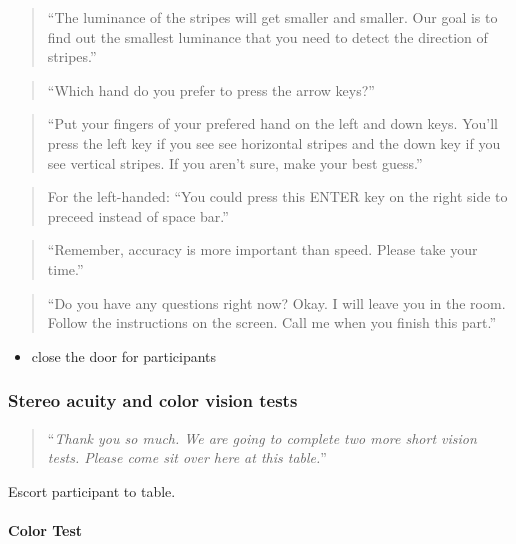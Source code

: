\documentclass[]{article}
\providecommand{\tightlist}{%
  \setlength{\itemsep}{0pt}\setlength{\parskip}{0pt}}
\let\oldparagraph\paragraph
\renewcommand{\paragraph}[1]{\oldparagraph{#1}\mbox{}}
\begin{document}
\begin{quote}
``The luminance of the stripes will get smaller and smaller. Our goal is
to find out the smallest luminance that you need to detect the direction
of stripes.''
\end{quote}

\begin{quote}
``Which hand do you prefer to press the arrow keys?''
\end{quote}

\begin{quote}
``Put your fingers of your prefered hand on the left and down keys.
You'll press the left key if you see see horizontal stripes and the down
key if you see vertical stripes. If you aren't sure, make your best
guess.''
\end{quote}

\begin{quote}
For the left-handed: ``You could press this ENTER key on the right side
to preceed instead of space bar.''
\end{quote}

\begin{quote}
``Remember, accuracy is more important than speed. Please take your
time.''
\end{quote}

\begin{quote}
``Do you have any questions right now? Okay. I will leave you in the
room. Follow the instructions on the screen. Call me when you finish
this part.''
\end{quote}

\begin{itemize}
\tightlist
\item
  close the door for participants
\end{itemize}

\subsubsection{Stereo acuity and color vision
tests}\label{stereo-acuity-and-color-vision-tests}

\begin{quote}
``\emph{Thank you so much. We are going to complete two more short
vision tests. Please come sit over here at this table.}''
\end{quote}

Escort participant to table.

\paragraph{Color Test}\label{color-test}
\end{document}
